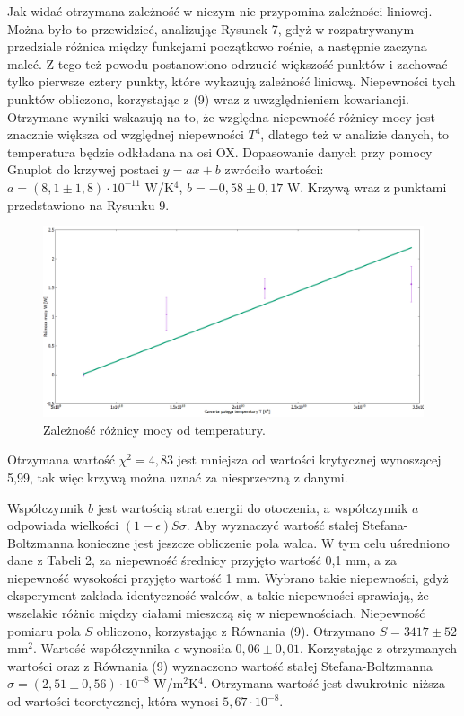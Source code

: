 \documentclass[10pt,a4paper]{article}
\begin{document}
Jak widać otrzymana zależność w niczym nie przypomina zależności liniowej. Można było to przewidzieć, analizując Rysunek 7, gdyż w rozpatrywanym przedziale różnica między funkcjami początkowo rośnie, a następnie zaczyna maleć. Z tego też powodu postanowiono odrzucić większość punktów i zachować tylko pierwsze cztery punkty, które wykazują zależność liniową. Niepewności tych punktów obliczono, korzystając z (9) wraz z uwzględnieniem kowariancji. Otrzymane wyniki wskazują na to, że względna niepewność różnicy mocy jest znacznie większa od względnej niepewności $T^4$, dlatego też w analizie danych, to temperatura będzie odkładana na osi OX. Dopasowanie danych przy pomocy Gnuplot do krzywej postaci $y=ax+b$ zwróciło wartości: $a=(8,1\pm1,8)\cdot10^{-11}$ W/K$^4$, $b=-0,58\pm0,17$ W. Krzywą wraz z punktami przedstawiono na Rysunku 9.

\begin{figure}[h!]
\includegraphics[width=15cm]{rap11rys8} 
\centering
\caption{Zależność różnicy mocy od temperatury.}
\end{figure}
Otrzymana wartość $\chi^2=4,83$ jest mniejsza od wartości krytycznej wynoszącej 5,99, tak więc krzywą można uznać za niesprzeczną z danymi.

Współczynnik $b$ jest wartością strat energii do otoczenia, a współczynnik $a$ odpowiada wielkości $(1-\epsilon)S\sigma$. Aby wyznaczyć wartość stałej Stefana-Boltzmanna konieczne jest jeszcze obliczenie pola walca. W tym celu uśredniono dane z Tabeli 2, za niepewność średnicy przyjęto wartość 0,1 mm, a za niepewność wysokości przyjęto wartość 1 mm. Wybrano takie niepewności, gdyż eksperyment zakłada identyczność walców, a takie niepewności sprawiają, że wszelakie różnic między ciałami mieszczą się w niepewnościach.
Niepewność pomiaru pola $S$ obliczono, korzystając z Równania (9). Otrzymano $S=3417\pm52$ mm$^2$. Wartość współczynnika $\epsilon$ wynosiła $0,06\pm0,01$. Korzystając z otrzymanych wartości oraz z Równania (9) wyznaczono wartość stałej Stefana-Boltzmanna $\sigma=(2,51\pm0,56)\cdot 10^{-8}$ W/m$^2$K$^4$. Otrzymana wartość jest dwukrotnie niższa od wartości teoretycznej, która wynosi $5,67\cdot 10^{-8}$. 
\end{document}

